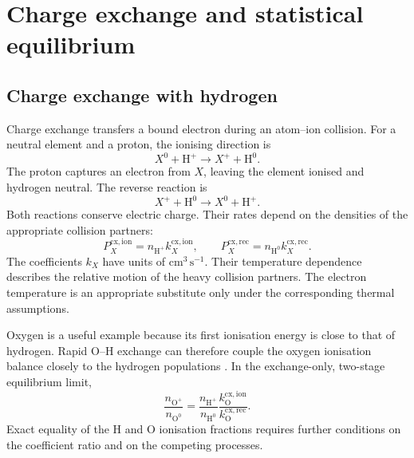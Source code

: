 \documentclass[a4paper,10pt,twoside,openany]{book}
\newcommand{\ChapColor}{Cap1Blue}
\newcommand{\ChapColorLight}{LightBlue}
\newcommand{\setChapColor}[2]{%
  \renewcommand{\ChapColor}{#1}%
  \renewcommand{\ChapColorLight}{#2}}
\begin{document}
\setChapColor{Cap3Green}{LightGreen}
\chapter{Charge exchange and statistical equilibrium}

\section{Charge exchange with hydrogen}
\label{subsec:ion_charge_exchange}

Charge exchange transfers a bound electron during an atom--ion collision.
For a neutral element and a proton, the ionising direction is
\begin{equation}
 X^0+\mathrm H^+
 \longrightarrow X^++\mathrm H^0.
 \label{eq:ion_cx_forward}
\end{equation}
The proton captures an electron from \(X\), leaving the element ionised and
hydrogen neutral. The reverse reaction is
\begin{equation}
 X^++\mathrm H^0
 \longrightarrow X^0+\mathrm H^+.
 \label{eq:ion_cx_reverse}
\end{equation}
Both reactions conserve electric charge. Their rates depend on the densities
of the appropriate collision partners:
\begin{equation}
 P_X^{\mathrm{cx,ion}}
 =n_{\mathrm{H^+}}k_X^{\mathrm{cx,ion}},
 \qquad
 P_X^{\mathrm{cx,rec}}
 =n_{\mathrm{H^0}}k_X^{\mathrm{cx,rec}}.
 \label{eq:ion_cx_rates}
\end{equation}
The coefficients \(k_X\) have units of \(\mathrm{cm^3\,s^{-1}}\).
Their temperature dependence describes the relative motion of the heavy
collision partners. The electron temperature is an appropriate substitute
only under the corresponding thermal assumptions.

Oxygen is a useful example because its first ionisation energy is close to
that of hydrogen. Rapid O--H exchange can therefore couple the oxygen
ionisation balance closely to the hydrogen populations
\cite{dufresne2021}. In the exchange-only, two-stage equilibrium limit,
\begin{equation}
 \frac{n_{\mathrm{O^+}}}{n_{\mathrm{O^0}}}
 =
 \frac{n_{\mathrm{H^+}}}{n_{\mathrm{H^0}}}
 \frac{k_{\mathrm O}^{\mathrm{cx,ion}}}
      {k_{\mathrm O}^{\mathrm{cx,rec}}}.
 \label{eq:ion_oxygen_exchange_limit}
\end{equation}
Exact equality of the H and O ionisation fractions requires further conditions
on the coefficient ratio and on the competing processes.
\end{document}
